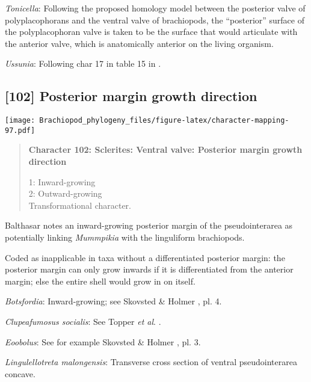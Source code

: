 \documentclass[openany]{book}
\theoremstyle{definition}
\theoremstyle{definition}
\theoremstyle{definition}
\theoremstyle{remark}
\begin{document}
\hypertarget{Tonicella-coding-101}{}
\emph{Tonicella}: Following the proposed homology model between the
posterior valve of polyplacophorans and the ventral valve of
brachiopods, the ``posterior'' surface of the polyplacophoran valve is
taken to be the surface that would articulate with the anterior valve,
which is anatomically anterior on the living organism.

\hypertarget{Ussunia-coding-101}{}
\emph{Ussunia}: Following char 17 in table 15 in
\citet{Williams2000LinguliformeaCraniiformea}.

\subsection*{{[}102{]} Posterior margin growth
direction}\label{posterior-margin-growth-direction}

\texttt{[image: Brachiopod\_phylogeny\_files/figure-latex/character-mapping-97.pdf]}

\begin{quote}
\textbf{Character 102: Sclerites: Ventral valve: Posterior margin growth
direction}

1: Inward-growing\\
2: Outward-growing\\
Transformational character.
\end{quote}

Balthasar \citeyearpar{Balthasar2008iMummpikia} notes an inward-growing
posterior margin of the pseudointerarea as potentially linking
\emph{Mummpikia} with the linguliform brachiopods.

Coded as inapplicable in taxa without a differentiated posterior margin:
the posterior margin can only grow inwards if it is differentiated from
the anterior margin; else the entire shell would grow in on itself.

\hypertarget{Botsfordia-coding-102}{}
\emph{Botsfordia}: Inward-growing; see Skovsted \& Holmer
\citeyearpar{Skovsted2005EarlyCambrian}, pl. 4.

\hypertarget{Clupeafumosus_socialis-coding-102}{}
\emph{Clupeafumosus socialis}: See Topper \emph{et al}.
\citeyearpar{Topper2013Reappraisalof}.

\hypertarget{Eoobolus-coding-102}{}
\emph{Eoobolus}: See for example Skovsted \& Holmer
\citeyearpar{Skovsted2005EarlyCambrian}, pl. 3.

\hypertarget{Lingulellotreta_malongensis-coding-102}{}
\emph{Lingulellotreta malongensis}: Transverse cross section of ventral
pseudointerarea concave.
\end{document}
